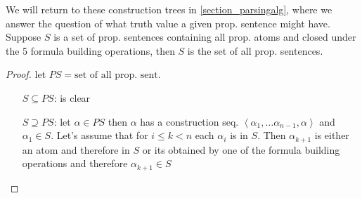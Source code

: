 We will return to these construction trees in \ref{section_parsingalg}, where we answer the question of what 
truth value a given prop. sentence might have.
\newpage
{}
\noindent{} Suppose $S$ is a set of prop. sentences
containing all prop. atoms and closed under the 5 formula building operations, 
then $S$ is the set of all prop. sentences.
\begin{proof}
    let $PS = \text{set of all prop. sent.}$
    \begin{itemize}[leftmargin=2cm]
        \item[$S\subseteq PS$:] is clear
        \item[$S\supseteq PS$:] let $\alpha\in PS$ then $\alpha$ has a construction seq. $\left\langle \alpha_1,\dots \alpha_{n-1},\alpha\right\rangle$ and $\alpha_1\in S$.
        Let's assume that for $i\leq k<n$ each $\alpha_i$ is in $S$. Then $\alpha_{k+1}$ is either an atom and therefore in $S$ or its obtained by one of the formula building operations  
        and therefore $\alpha_{k+1}\in S$
    \end{itemize}
\end{proof}
